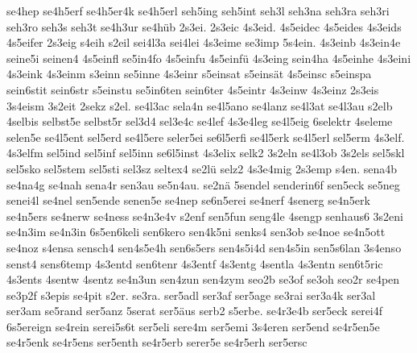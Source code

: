 {    se4hep
    se4h5erf
    se4h5er4k
    se4h5erl
    seh5ing
    seh5int
    seh3l
    seh3na
    seh3ra
    seh3ri
    seh3ro
    seh3s
    seh3t
    se4h3ur
    se4hüb
    2s3ei.
    2s3eic
    4s3eid.
    4s5eidec
    4s5eides
    4s3eids
    4s5eifer
    2s3eig
    s4eih
    s2eil
    sei4l3a
    sei4lei
    4s3eime
    se3imp
    5s4ein.
    4s3einb
    4s3ein4e
    seine5i
    seinen4
    4s5einfl
    se5in4fo
    4s5einfu
    4s5einfü
    4s3eing
    sein4ha
    4s5einhe
    4s3eini
    4s3eink
    4s3einm
    s3einn
    se5inne
    4s3einr
    s5einsat
    s5einsät
    4s5einsc
    s5einspa
    sein6stit
    sein6str
    s5einstu
    se5in6ten
    sein6ter
    4s5eintr
    4s3einw
    4s3einz
    2s3eis
    3s4eism
    3s2eit
    2sekz
    s2el.
    se4l3ac
    sela4n
    se4l5ano
    se4lanz
    se4l3at
    se4l3au
    s2elb
    4selbis
    selbst5e
    selbst5r
    sel3d4
    sel3e4c
    se4lef
    4s3e4leg
    se4l5eig
    6selektr
    4seleme
    selen5e
    se4l5ent
    sel5erd
    se4l5ere
    seler5ei
    se6l5erfi
    se4l5erk
    se4l5erl
    sel5erm
    4s3elf.
    4s3elfm
    sel5ind
    sel5inf
    sel5inn
    se6l5inst
    4s3elix
    selk2
    3s2eln
    se4l3ob
    3s2els
    sel5skl
    sel5sko
    sel5stem
    sel5sti
    sel3sz
    seltex4
    se2lü
    selz2
    4s3e4mig
    2s3emp
    s4en.
    sena4b
    se4na4g
    se4nah
    sena4r
    sen3au
    se5n4au.
    se2nä
    5sendel
    senderin6f
    sen5eck
    se5neg
    senei4l
    se4nel
    sen5ende
    senen5e
    se4nep
    se6n5erei
    se4nerf
    4senerg
    se4n5erk
    se4n5ers
    se4nerw
    se4ness
    se4n3e4v
    s2enf
    sen5fun
    seng4le
    4sengp
    senhaus6
    3s2eni
    se4n3im
    se4n3in
    6s5en6keli
    sen6kero
    sen4k5ni
    senks4
    sen3ob
    se4noe
    se4n5ott
    se4noz
    s4ensa
    sensch4
    sen4s5e4h
    sen6s5ers
    sen4s5i4d
    sen4s5in
    sen5s6lan
    3s4enso
    senst4
    sens6temp
    4s3entd
    sen6tenr
    4s3entf
    4s3entg
    4sentla
    4s3entn
    sen6t5ric
    4s3ents
    4sentw
    4sentz
    se4n3un
    sen4zun
    sen4zym
    seo2b
    se3of
    se3oh
    seo2r
    se4pen
    se3p2f
    s3epis
    se4pit
    s2er.
    se3ra.
    ser5adl
    ser3af
    ser5age
    se3rai
    ser3a4k
    ser3al
    ser3am
    se5rand
    ser5anz
    5serat
    ser5äus
    serb2
    s5erbe.
    se4r3e4b
    ser5eck
    serei4f
    6s5ereign
    se4rein
    serei5s6t
    ser5eli
    sere4m
    ser5emi
    3s4eren
    ser5end
    se4r5en5e
    se4r5enk
    se4r5ens
    ser5enth
    se4r5erb
    serer5e
    se4r5erh
    ser5ersc
}
